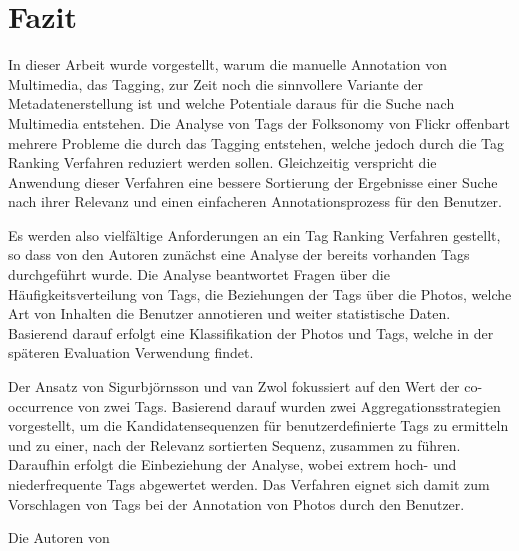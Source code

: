 \section{Fazit}
In dieser Arbeit wurde vorgestellt, warum die manuelle Annotation von Multimedia, das Tagging, zur Zeit noch die sinnvollere Variante der Metadatenerstellung ist und welche Potentiale daraus für die Suche nach Multimedia entstehen. Die Analyse von Tags der Folksonomy von Flickr offenbart mehrere Probleme die durch das Tagging entstehen, welche jedoch durch die Tag Ranking Verfahren reduziert werden sollen. Gleichzeitig verspricht die Anwendung dieser Verfahren eine bessere Sortierung der Ergebnisse einer Suche nach ihrer Relevanz und einen einfacheren Annotationsprozess für den Benutzer. %

Es werden also vielfältige Anforderungen an ein Tag Ranking Verfahren gestellt, so dass von den Autoren zunächst eine Analyse der bereits vorhanden Tags durchgeführt wurde. Die Analyse beantwortet Fragen über die Häufigkeitsverteilung von Tags, die Beziehungen der Tags über die Photos, welche Art von Inhalten die Benutzer annotieren und weiter statistische Daten. Basierend darauf erfolgt eine Klassifikation der Photos und Tags, welche in der späteren Evaluation Verwendung findet.

Der Ansatz von Sigurbjörnsson und van Zwol fokussiert auf den Wert der co-occurrence von zwei Tags. Basierend darauf wurden zwei Aggregationsstrategien vorgestellt, um die Kandidatensequenzen für benutzerdefinierte Tags zu ermitteln und zu einer, nach der Relevanz sortierten Sequenz, zusammen zu führen. Daraufhin erfolgt die Einbeziehung der Analyse, wobei extrem hoch- und niederfrequente Tags abgewertet werden. Das Verfahren eignet sich damit zum Vorschlagen von Tags bei der Annotation von Photos durch den Benutzer.

Die Autoren von \cite{ranking} 
